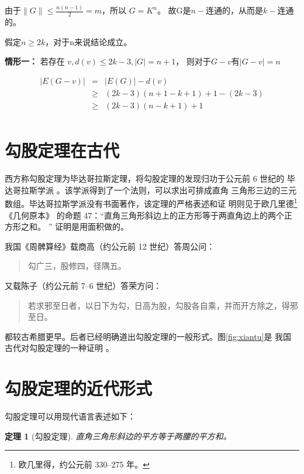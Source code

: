 \documentclass[UTF8]{ctexart}
\newenvironment{myquote}
{\begin{quote}\kaishu\zihao{-5}}
{\end{quote}}
\newtheorem{thm}{定理}
\begin{document}
    由于$\| G \| \leq \frac{n(n-1)}{2} = m $，所以 $G = K^{n}$。
    故G是$n-$连通的，从而是$k-$连通的。
    
    假定$ n\geq 2k $，对于n来说结论成立。
    
    \textbf{情形一：}
    若存在 $v,  d(v) \leq 2k - 3 , |G| = n+1 $，
    则对于$G-v$有$|G-v|=n$
    
    \begin{eqnarray*}
    |E(G-v)| & =    & | E(G) | - d(v)  \\
             & \geq & ( 2k-3)( n+1-k+1 )+1-(2k-3) \\
             & \geq & ( 2k-3)( n-k+1 )+1 \\
    \end{eqnarray*}
    
    
    \tableofcontents
    \section{勾股定理在古代}\label{sec:diyijie}
    西方称勾股定理为毕达哥拉斯定理，将勾股定理的发现归功于公元前 6 世纪的
    毕达哥拉斯学派 \cite{Kline}。该学派得到了一个法则，可以求出可排成直角
    三角形三边的三元数组。毕达哥拉斯学派没有书面著作，该定理的严格表述和证
    明则见于欧几里德\footnote{欧几里得，约公元前 330--275 年。}《几何原本》
    的命题 47：“直角三角形斜边上的正方形等于两直角边上的两个正方形之和。 ” 
    证明是用面积做的。
    
    我国《周髀算经》载商高（约公元前 12 世纪）答周公问：
    \begin{myquote}
        勾广三，股修四，径隅五。
    \end{myquote}
    又载陈子（约公元前 7--6 世纪）答荣方问：
    \begin{myquote}
        若求邪至日者，以日下为勾，日高为股，勾股各自乘，并而开方除之，得邪至日。
    \end{myquote}
    都较古希腊更早。后者已经明确道出勾股定理的一般形式。图\ref{fig:xiantu}是
    我国古代对勾股定理的一种证明 \cite{quanjing}。
   
    \section{勾股定理的近代形式}
    勾股定理可以用现代语言表述如下：
    \begin{thm}[勾股定理]
        直角三角形斜边的平方等于两腰的平方和。
    \end{thm}
\end{document}
